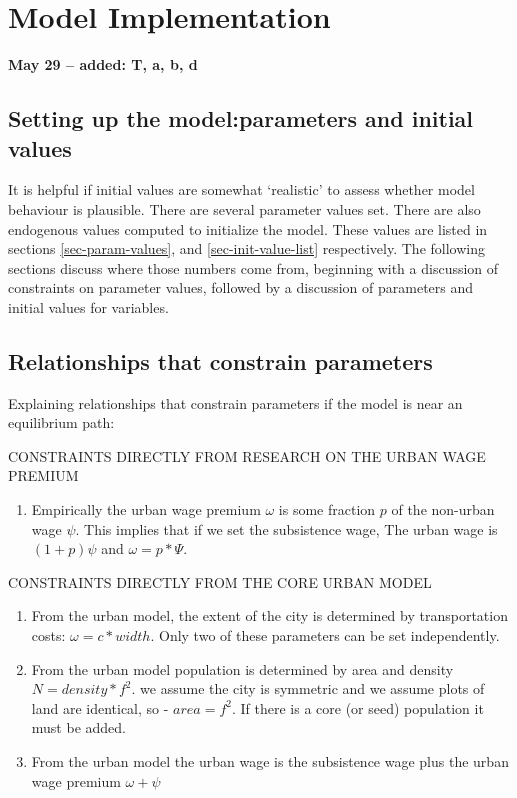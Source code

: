 \chapter[Model Implementation]{Model Implementation}
\textbf{May 29 -- added: T, a, b, d}
\section{Setting up the model:\newline parameters and initial values}
It is helpful if initial values are somewhat `realistic' to assess whether model behaviour is plausible. 
There are several parameter values set. There are also endogenous values computed to initialize the model. These values are listed in sections \ref{sec-param-values}, and \ref{sec-init-value-list} respectively. The following sections discuss where those numbers come from, beginning with a discussion of constraints on parameter values, followed by a discussion of parameters and initial values for variables. %

\section{Relationships that constrain parameters }

Explaining relationships that constrain parameters if the model is near an equilibrium path: 

CONSTRAINTS DIRECTLY FROM RESEARCH ON THE URBAN WAGE PREMIUM
\begin{enumerate}
     \item  Empirically the urban wage premium  $\omega$ is some fraction $p$ of the non-urban wage $\psi$.   This implies that if we set the subsistence wage, The urban wage is $(1+p)\psi$ and $\omega= p*\Psi$.
\end{enumerate}

CONSTRAINTS DIRECTLY FROM THE CORE URBAN MODEL
\begin{enumerate}
    \item From the urban model, the extent of the city is determined by transportation costs:   $\omega =c*width$.  Only two of these parameters can be set independently.

    \item From the urban model population is determined by area and density   $N=density* f^2$. we assume the city is symmetric  and we assume plots  of land are identical, so  - $area=f^2$. If there is a core (or seed) population it must be added.  
   
    \item From the urban model the urban wage is the subsistence wage plus the urban wage premium $\omega+\psi$ 
\end{enumerate}

